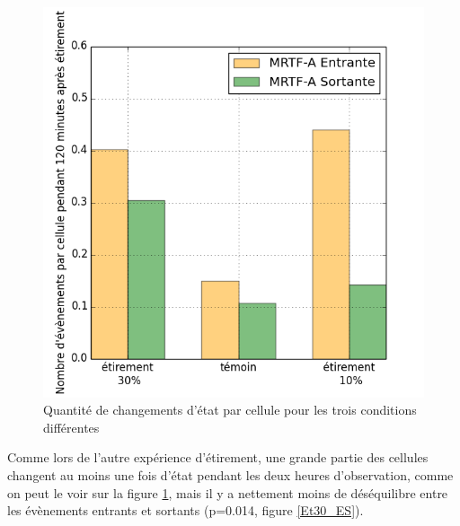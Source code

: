 \begin{figure}
\includegraphics[scale=0.5]{Figures/Etirement30_vs_temoin_activite.png}
\caption{\label{Et30_activite} Quantité de changements d'état par cellule pour les trois conditions différentes}
\end{figure}

Comme lors de l'autre expérience d'étirement, une grande partie des cellules changent au moins une fois d'état pendant les deux heures d'observation, comme on peut le voir sur la figure \ref{Et30_activite}, mais il y a nettement moins de déséquilibre entre les évènements entrants et sortants (p=0.014, figure \ref{Et30_ES}). 

